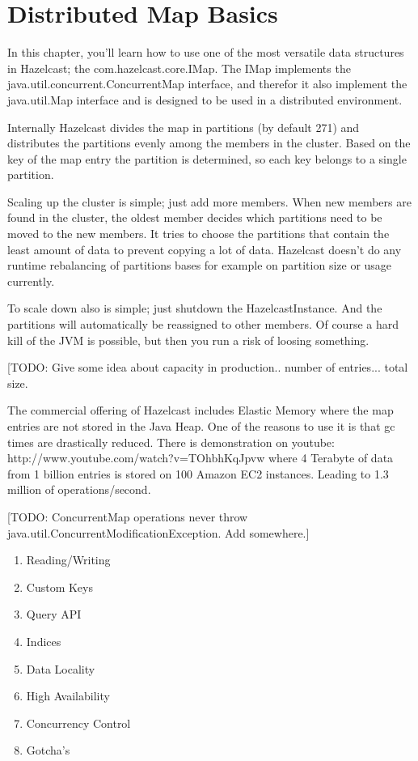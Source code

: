 \chapter{Distributed Map Basics}

In this chapter, you'll learn how to use one of the most versatile data structures in Hazelcast; the com.hazelcast.core.IMap. The IMap implements the java.util.concurrent.ConcurrentMap interface, and therefor it also implement the java.util.Map interface and is designed to be used in a distributed environment.

Internally Hazelcast divides the map in partitions (by default 271) and distributes the partitions evenly among the members in the cluster. Based on the key of the map entry the partition is determined, so each key belongs to a single partition. 

Scaling up the cluster is simple; just add more members. When new members are found in the cluster, the oldest member decides which partitions need to be moved to the new members. It tries to choose the partitions that contain the least amount of data to prevent copying a lot of data. Hazelcast doesn't do any runtime rebalancing of partitions bases for example on partition size or usage currently.

To scale down also is simple; just shutdown the HazelcastInstance. And the partitions will automatically be reassigned to other members. Of course a hard kill of the JVM is possible, but then you run a risk of loosing something.

[TODO: Give some idea about capacity in production.. number of entries... total size.

The commercial offering of Hazelcast includes Elastic Memory where the map entries are not stored in the Java Heap. One of the reasons to use it is that gc times are drastically reduced. There is demonstration on youtube: http://www.youtube.com/watch?v=TOhbhKqJpvw  where 4 Terabyte of data from 1 billion entries is stored on 100 Amazon EC2 instances. Leading to 1.3 million of operations/second.

[TODO: ConcurrentMap operations never throw java.util.ConcurrentModificationException. Add somewhere.]

\begin{enumerate}
\item Reading/Writing
\item Custom Keys
\item Query API
\item Indices
\item Data Locality
\item High Availability
\item Concurrency Control
\item Gotcha's
\end{enumerate}

